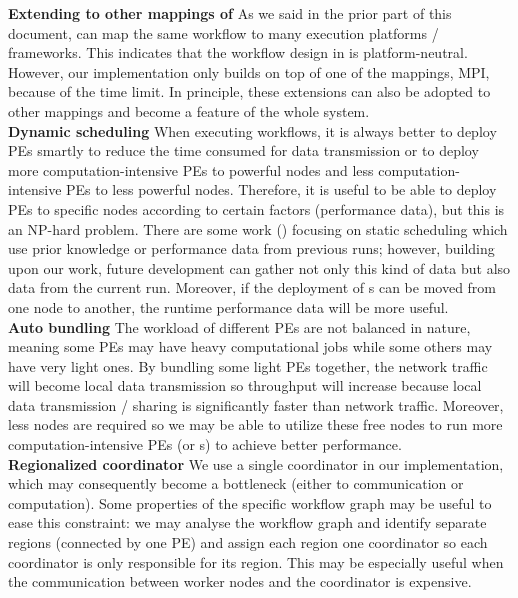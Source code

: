 \textbf{Extending to other mappings of \dpy}\quad
As we said in the prior part of this document, \dpy can map the same workflow to many execution platforms / frameworks. This indicates that the workflow design in \dpy is platform-neutral. However, our implementation only builds on top of one of the mappings, MPI, because of the time limit. In principle, these extensions can also be adopted to other mappings and become a feature of the whole \dpy system. \\

\textbf{Dynamic scheduling}\quad
When executing workflows, it is always better to deploy PEs smartly to reduce the time consumed for data transmission or to deploy more computation-intensive PEs to powerful nodes and less computation-intensive PEs to less powerful nodes. Therefore, it is useful to be able to deploy PEs to specific nodes according to certain factors (\eg performance data), but this is an NP-hard problem. There are some work (\eg \cite{teylo2017hybrid}) focusing on static scheduling which use prior knowledge or performance data from previous runs; however, building upon our work, future development can gather not only this kind of data but also data from the current run. Moreover, if the deployment of \tPEInst{}s can be moved from one node to another, the runtime performance data will be more useful. \\

\textbf{Auto bundling}\quad
The workload of different PEs are not balanced in nature, meaning some PEs may have heavy computational jobs while some others may have very light ones. By bundling some light PEs together, the network traffic will become local data transmission so throughput will increase because local data transmission / sharing is significantly faster than network traffic. Moreover, less nodes are required so we may be able to utilize these free nodes to run more computation-intensive PEs (or \tPEDup{}s) to achieve better performance. \\

\textbf{Regionalized coordinator}\quad
We use a single coordinator in our implementation, which may consequently become a bottleneck (either to communication or computation). Some properties of the specific workflow graph may be useful to ease this constraint: we may analyse the workflow graph and identify separate regions (\eg connected by one PE) and assign each region one coordinator so each coordinator is only responsible for its region. This may be especially useful when the communication between worker nodes and the coordinator is expensive. \\

